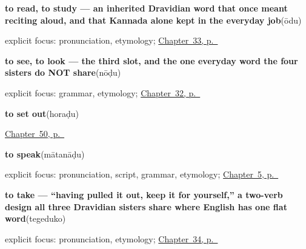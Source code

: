 \noindent\begin{minipage}[t]{\linewidth}
\raggedright
\textbf{to read, to study — an inherited Dravidian word that once meant reciting aloud, and that Kannada alone kept in the everyday job}\enspace\emph{}\enspace(ōdu)\par
\footnotesize explicit focus: pronunciation, etymology; \hyperref[ch:ka-mind-verbs]{Chapter~33, p.~\pageref*{ch:ka-mind-verbs}}
\end{minipage}\par\smallskip

\noindent\begin{minipage}[t]{\linewidth}
\raggedright
\textbf{to see, to look — the third slot, and the one everyday word the four sisters do NOT share}\enspace\emph{}\enspace(nōḍu)\par
\footnotesize explicit focus: grammar, etymology; \hyperref[ch:ka-core-verbs]{Chapter~32, p.~\pageref*{ch:ka-core-verbs}}
\end{minipage}\par\smallskip

\noindent\begin{minipage}[t]{\linewidth}
\raggedright
\textbf{to set out}\enspace\emph{}\enspace(horaḍu)\par
\footnotesize \hyperref[ch:ka-leave-more]{Chapter~50, p.~\pageref*{ch:ka-leave-more}}
\end{minipage}\par\smallskip

\noindent\begin{minipage}[t]{\linewidth}
\raggedright
\textbf{to speak}\enspace\emph{}\enspace(mātanāḍu)\par
\footnotesize explicit focus: pronunciation, script, grammar, etymology; \hyperref[ch:first-verbs]{Chapter~5, p.~\pageref*{ch:first-verbs}}
\end{minipage}\par\smallskip

\noindent\begin{minipage}[t]{\linewidth}
\raggedright
\textbf{to take — \textquotedblleft{}having pulled it out, keep it for yourself,\textquotedblright{} a two-verb design all three Dravidian sisters share where English has one flat word}\enspace\emph{}\enspace(tegeduko)\par
\footnotesize explicit focus: pronunciation, etymology; \hyperref[ch:ka-social-verbs]{Chapter~34, p.~\pageref*{ch:ka-social-verbs}}
\end{minipage}\par\smallskip


